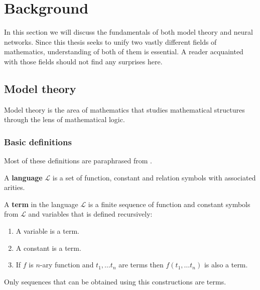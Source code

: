 \chapter{Background}
In this section we will discuss the fundamentals of both model theory and neural networks. Since this thesis seeks to unify two vastly different fields of mathematics, understanding of both of them is essential. A reader acquainted with those fields should not find any surprises here.


\section{Model theory}
Model theory is the area of mathematics that studies mathematical structures through the lens of mathematical logic.
\subsection{Basic definitions}
Most of these definitions are paraphrased from \cite{model}.
\begin{defn} A \textbf{language} $\mathcal{L}$ is a set of function, constant and relation symbols with associated arities.
\end{defn}

\begin{defn} A \textbf{term} in the language $\mathcal{L}$ is a finite sequence of function and constant symbols from $\mathcal{L}$ and variables that is defined recursively:
	\begin{enumerate}
	\item A variable is a term.
	\item A constant is a term.
	\item If $f$ is $n$-ary function and $t_1, \dots t_n$ are terms then $f(t_1, \dots t_n)$ is also a term.
	\end{enumerate}
Only sequences that can be obtained using this constructions are terms.
\end{defn}

